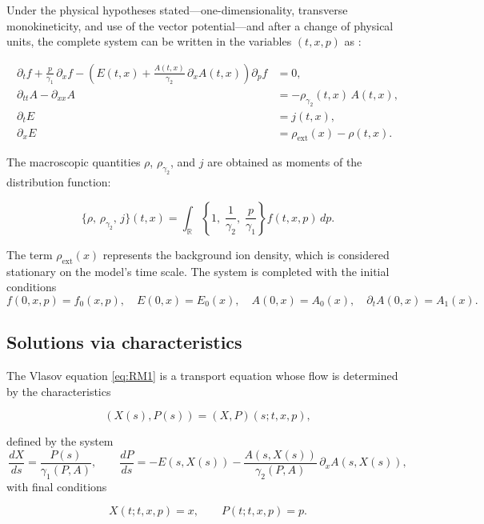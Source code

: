 \documentclass[11pt,a4paper,twoside,pdf]{article}
\numberwithin{equation}{section}
\begin{document}
Under the physical hypotheses stated—one-dimensionality, transverse monokineticity, and use of the vector potential—and after a change of physical units, the complete system can be written in the variables $(t,x,p)$ as \cite{carrillo2006global}:

\begin{align}
\partial_t f
+ \frac{p}{\gamma_1}\,\partial_x f
- \left( E(t,x)
+ \frac{A(t,x)}{\gamma_2}\,\partial_x A(t,x) \right)\partial_p f &= 0, \label{eq:RM1}\\[0.4em]
\partial_{tt} A - \partial_{xx} A &= - \rho_{\gamma_2}(t,x)\,A(t,x), \label{eq:RM2}\\[0.4em]
\partial_t E &= j(t,x), \label{eq:RM3}\\[0.4em]
\partial_x E &= \rho_{\mathrm{ext}}(x) - \rho(t,x). \label{eq:RM4}
\end{align}

The macroscopic quantities $\rho$, $\rho_{\gamma_2}$, and $j$ are obtained as moments of the distribution function:


\[
\{\rho,\,\rho_{\gamma_2},\,j\}(t,x)
= \int_{\mathbb{R}} \left\{ 1,\;\frac{1}{\gamma_2},\;\frac{p}{\gamma_1} \right\} f(t,x,p)\,dp.
\]




The term $\rho_{\mathrm{ext}}(x)$ represents the background ion density, which is considered stationary on the model's time scale. The system is completed with the initial conditions
\begin{equation}
f(0,x,p)=f_0(x,p), \quad
E(0,x)=E_0(x), \quad
A(0,x)=A_0(x), \quad
\partial_t A(0,x)=A_1(x).
\label{eq:IC}
\end{equation}

\subsection{Solutions via characteristics}

The Vlasov equation \eqref{eq:RM1} is a transport equation whose flow is determined by the characteristics \cite{romeroedp}


\[
(X(s),P(s)) = (X,P)(s;t,x,p),
\]


defined by the system
\begin{equation}
\frac{dX}{ds} = \frac{P(s)}{\gamma_1(P,A)}, \qquad
\frac{dP}{ds} = -E(s,X(s)) - \frac{A(s,X(s))}{\gamma_2(P,A)}\,\partial_x A(s,X(s)),
\label{eq:char}
\end{equation}
with final conditions


\[
X(t;t,x,p)=x, \qquad P(t;t,x,p)=p.
\]
\end{document}
